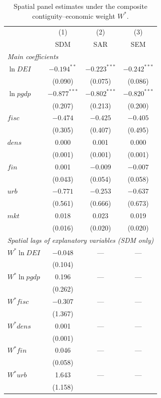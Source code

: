 \documentclass[economies,article,submit,moreauthors]{Definitions/mdpi}
\begin{document}
\begin{table}[H]
\centering
\caption{Spatial panel estimates under the composite contiguity--economic weight $W^{*}$.}
\label{tab:spatial_composite}
\scriptsize
\renewcommand{\arraystretch}{0.92}
\setlength{\tabcolsep}{4pt}
\begin{threeparttable}
\begin{tabular}{lccc}
\toprule
 & (1) & (2) & (3)\\
 & SDM & SAR & SEM\\
\midrule
\multicolumn{4}{l}{\textit{Main coefficients}}\\
$\ln DEI$ & $-0.194^{**}$ & $-0.223^{***}$ & $-0.242^{***}$\\
 & (0.090) & (0.075) & (0.086)\\
$\ln pgdp$ & $-0.877^{***}$ & $-0.802^{***}$ & $-0.820^{***}$\\
 & (0.207) & (0.213) & (0.200)\\
$fisc$ & $-0.474$ & $-0.425$ & $-0.405$\\
 & (0.305) & (0.407) & (0.495)\\
$dens$ & 0.000 & 0.001 & 0.000\\
 & (0.001) & (0.001) & (0.001)\\
$fin$ & 0.001 & $-0.009$ & $-0.007$\\
 & (0.043) & (0.054) & (0.058)\\
$urb$ & $-0.771$ & $-0.253$ & $-0.637$\\
 & (0.561) & (0.666) & (0.673)\\
$mkt$ & 0.018 & 0.023 & 0.019\\
 & (0.016) & (0.020) & (0.020)\\
\midrule
\multicolumn{4}{l}{\textit{Spatial lags of explanatory variables (SDM only)}}\\
$W^{*}\ln DEI$ & $-0.048$ & --- & ---\\
 & (0.104) & & \\
$W^{*}\ln pgdp$ & 0.196 & --- & ---\\
 & (0.262) & & \\
$W^{*}fisc$ & $-0.307$ & --- & ---\\
 & (1.367) & & \\
$W^{*}dens$ & 0.001 & --- & ---\\
 & (0.001) & & \\
$W^{*}fin$ & 0.046 & --- & ---\\
 & (0.058) & & \\
$W^{*}urb$ & 1.643 & --- & ---\\
 & (1.158) & & \\

\end{tabular}
\end{threeparttable}
\end{table}
\end{document}
